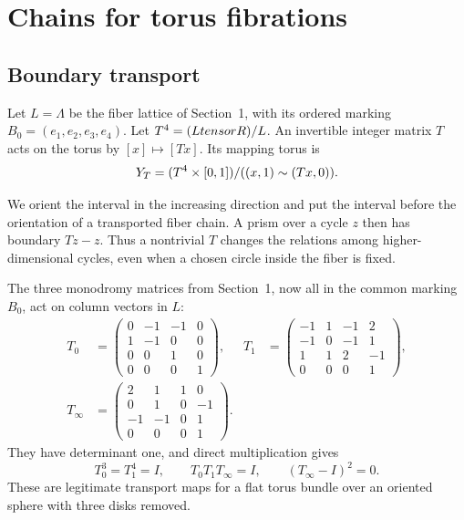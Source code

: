 \section{Chains for torus fibrations}\label{sec:torus-chains}

\subsection{Boundary transport}\label{ntg:sec:boundary}

Let $L=\Lambda$ be the fiber lattice of Section~1,
with its ordered marking $B_0=(e_1,e_2,e_3,e_4)$. Let
$T^4=(LtensorR)/L$. An invertible integer matrix $T$ acts
on the torus by $[x]\mapsto[Tx]$. Its mapping torus is
\[
 Y_T=(T^4\times[0,1])/((x,1)\sim(Tx,0)).
\]

We orient the interval in the increasing direction and put the interval
before the orientation of a transported fiber chain. A prism over a
cycle $z$ then has boundary $Tz-z$. Thus a nontrivial $T$ changes the
relations among higher-dimensional cycles, even when a chosen circle
inside the fiber is fixed.

The three monodromy matrices from Section~1, now all in the common
marking $B_0$, act on column vectors in $L$:
\begin{equation}\label{ntg:eq:native}
\begin{aligned}
 T_0&=\begin{pmatrix}0&-1&-1&0\\1&-1&0&0\\0&0&1&0\\0&0&0&1\end{pmatrix},
 &T_1&=\begin{pmatrix}-1&1&-1&2\\-1&0&-1&1\\1&1&2&-1\\0&0&0&1\end{pmatrix},\\
 T_\infty&=\begin{pmatrix}2&1&1&0\\0&1&0&-1\\-1&-1&0&1\\0&0&0&1\end{pmatrix}.
\end{aligned}
\end{equation}
They have determinant one, and direct multiplication gives
\[
 T_0^3=T_1^4=I,\qquad T_0T_1T_\infty=I,
 \qquad (T_\infty-I)^2=0.
\]
These are legitimate transport maps for a flat torus bundle over an
oriented sphere with three disks removed.

